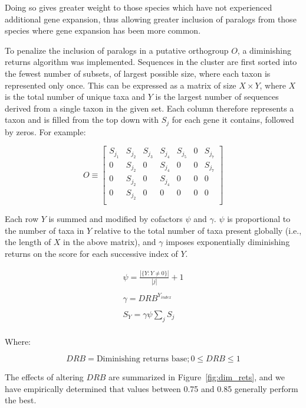 \documentclass[twocolumn]{bmcart}%
\begin{document}
Doing so gives greater weight to those species which have not experienced additional gene expansion, thus allowing greater inclusion of paralogs from those species where gene expansion has been more common.

To penalize the inclusion of paralogs in a putative orthogroup $O$, a diminishing returns algorithm was implemented.
Sequences in the cluster are first sorted into the fewest number of subsets, of largest possible size, where each taxon is represented only once.
This can be expressed as a matrix of size $X \times Y$, where $X$ is the total number of unique taxa and $Y$ is the largest number of sequences derived from a single taxon in the given set.
Each column therefore represents a taxon and is filled from the top down with $S_j$ for each gene it contains, followed by zeros.
For example:


\[
O \equiv
\begin{bmatrix}
    S_{j_1} & S_{j_2} & S_{j_3} & S_{j_4} & S_{j_5} & 0 & S_{j_7}\\
    0 & S_{j_2} & 0 & S_{j_4} & 0 & 0 & S_{j_7} \\
    0 & S_{j_2} & 0 & S_{j_4} & 0 & 0 & 0 \\
    0 & S_{j_2} & 0 & 0 & 0 & 0 & 0 \\
\end{bmatrix}
\]

Each row $Y$ is summed and modified by cofactors $\psi$ and $\gamma$. $\psi$ is proportional to the number of taxa in $Y$ relative to the total number of taxa present globally (i.e., the length of $X$ in the above matrix), and $\gamma$ imposes exponentially diminishing returns on the score for each successive index of $Y$.

\begin{gather*}
    \psi = \frac{|\{Y:Y \neq 0\}|}{|j|} + 1\\
    \\
    \gamma = DRB^{Y_{index}}\\
    \\
    S_Y = \gamma\psi\sum_{j} S_j\\
\end{gather*}

Where:

\[
DRB = \text{Diminishing returns base}; 0 \leq DRB \leq 1
\]

The effects of altering $DRB$ are summarized in Figure~\ref{fig:dim_rets}, and we have empirically determined that values between 0.75 and 0.85 generally perform the best.
\end{document}
